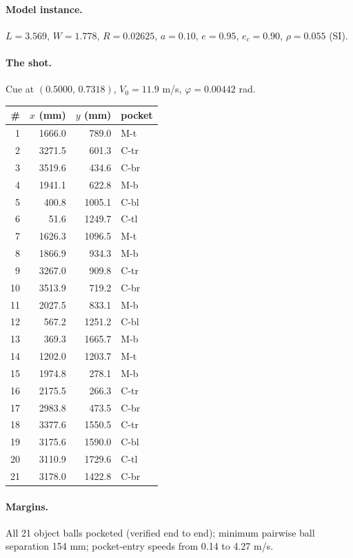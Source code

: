 \paragraph{Model instance.} $L=3.569$, $W=1.778$, $R=0.02625$, $a=0.10$, $e=0.95$, $e_c=0.90$, $\rho=0.055$ (SI).
\paragraph{The shot.} Cue at $(0.5000,\,0.7318)$, $V_0=11.9$ m/s, $\varphi=0.00442$ rad.
\begin{center}\begin{tabular}{rrrl}
\toprule
\# & $x$ (mm) & $y$ (mm) & pocket \\
\midrule
1 & 1666.0 & 789.0 & M-t \\
2 & 3271.5 & 601.3 & C-tr \\
3 & 3519.6 & 434.6 & C-br \\
4 & 1941.1 & 622.8 & M-b \\
5 & 400.8 & 1005.1 & C-bl \\
6 & 51.6 & 1249.7 & C-tl \\
7 & 1626.3 & 1096.5 & M-t \\
8 & 1866.9 & 934.3 & M-b \\
9 & 3267.0 & 909.8 & C-tr \\
10 & 3513.9 & 719.2 & C-br \\
11 & 2027.5 & 833.1 & M-b \\
12 & 567.2 & 1251.2 & C-bl \\
13 & 369.3 & 1665.7 & M-b \\
14 & 1202.0 & 1203.7 & M-t \\
15 & 1974.8 & 278.1 & M-b \\
16 & 2175.5 & 266.3 & C-tr \\
17 & 2983.8 & 473.5 & C-br \\
18 & 3377.6 & 1550.5 & C-tr \\
19 & 3175.6 & 1590.0 & C-bl \\
20 & 3110.9 & 1729.6 & C-tl \\
21 & 3178.0 & 1422.8 & C-br \\
\bottomrule
\end{tabular}\end{center}
\paragraph{Margins.} All 21 object balls pocketed (verified end to end); minimum pairwise ball separation 154 mm; pocket-entry speeds from 0.14 to 4.27 m/s.
